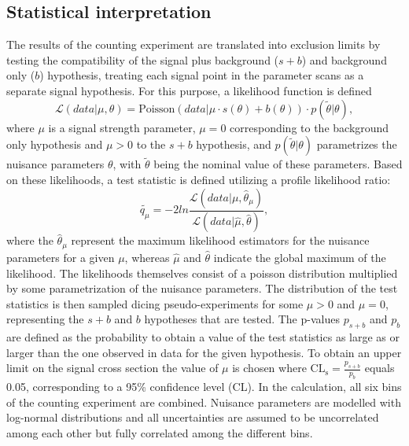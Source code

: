 \subsection{Statistical interpretation}
The results of the counting experiment are translated into exclusion limits by testing the compatibility of the signal plus background ($s+b$) and background only ($b$) hypothesis, treating each signal point in the parameter scans as a separate signal hypothesis. For this purpose, a likelihood function is defined~\cite{HiggsTool1}
\begin{equation}
\mathcal{L}(data|\mu,\theta) = \text{Poisson}(data|\mu\cdot s(\theta) + b(\theta))\cdot p(\tilde{\theta}|\theta),
\end{equation}
where $\mu$ is a signal strength parameter, $\mu = 0$ corresponding to the background only hypothesis and $\mu > 0$ to the  $s+b$ hypothesis, and $p(\tilde{\theta}|\theta)$ parametrizes the nuisance parameters $\theta$, with $\tilde{\theta}$ being the nominal value of these parameters. Based on these likelihoods, a test statistic is defined utilizing a profile likelihood ratio: 
\begin{equation}
\tilde{q_{\mu}} = -2 ln\frac{\mathcal{L}(data|\mu,\hat{\theta}_\mu)}{\mathcal{L}(data|\hat{\mu},\hat{\theta})},
\end{equation}
where the $\hat{\theta}_\mu$ represent the maximum likelihood estimators for the nuisance parameters for a given $\mu$, whereas $\hat{\mu}$ and $\hat{\theta}$ indicate the global maximum of the likelihood. The likelihoods themselves consist of a poisson distribution multiplied by some parametrization of the nuisance parameters. The distribution of the test statistics is then sampled dicing pseudo-experiments for some $\mu > 0$ and $\mu = 0$, representing the $s+b$ and $b$ hypotheses that are tested. The p-values $p_{s+b}$ and $p_{b}$ are defined as the probability to obtain a value of the test statistics as large as or larger than the one observed in data for the given hypothesis. To obtain an upper limit on the signal cross section the value of $\mu$ is chosen where $\mathrm{CL}_{\mathrm{s}} = \frac{p_{s+b}}{p_b}$ equals 0.05, corresponding to a 95\% confidence level (CL). In the calculation, all six bins of the counting experiment are combined. Nuisance parameters are modelled with log-normal distributions and all uncertainties are assumed to be uncorrelated among each other but fully correlated among the different bins.

